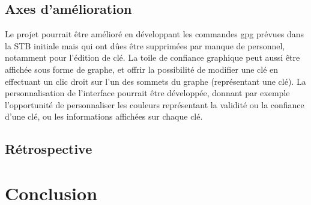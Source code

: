 \documentclass{../res/univ-projet}
\begin{document}
  \subsection{Axes d'amélioration}
  
    Le projet pourrait être amélioré en développant les commandes gpg prévues dans la STB initiale mais qui ont dûes être supprimées par manque de personnel, notamment pour l'édition de clé. 
    La toile de confiance graphique peut aussi être affichée sous forme de graphe, et offrir la possibilité de modifier une clé en effectuant un clic droit sur l'un des sommets du graphe (représentant une clé).
    La personnalisation de l'interface pourrait être développée, donnant par exemple l'opportunité de personnaliser les couleurs représentant la validité ou la confiance d'une clé, ou les informations affichées sur chaque clé.

  \subsection{Rétrospective}



\section{Conclusion}
\end{document}
